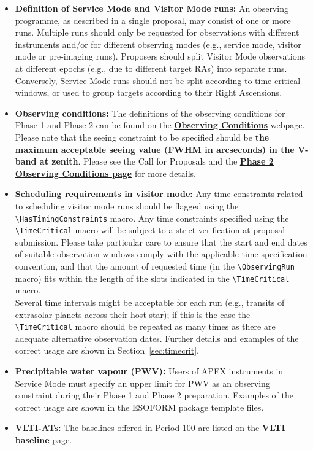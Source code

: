 \documentclass{article}
\begin{document}
\begin{itemize}
\item{\bf Definition of Service Mode and Visitor Mode runs: }
An observing programme, as described in a single proposal, may consist of one or more runs.
Multiple runs should only be requested for observations with different instruments and/or for different observing modes (e.g., service mode, visitor mode or pre-imaging runs).  Proposers should split Visitor Mode observations at different epochs (e.g., due to different target RAs) into separate runs. Conversely, Service Mode runs should not be split according to time-critical windows, or used to group targets according to their Right Ascensions.


\item{\bf Observing conditions:} The definitions of the observing conditions for Phase 1 and Phase 2
can be found on the  \href{http://www.eso.org/sci/observing/phase2/ObsConditions.html}{\bf \underline{Observing Conditions}} webpage.
Please note that the seeing constraint to be specified should be 
{\bf the maximum acceptable seeing value (FWHM in arcseconds) in the V-band at zenith}.
Please see the Call for Proposals and the 
\href{http://www.eso.org/sci/observing/phase2/ObsConditions.html}{\bf\underline{Phase 2 Observing Conditions page}}
for more details.


\item{\bf Scheduling requirements in visitor mode: }
Any time constraints related to scheduling visitor mode runs should be flagged
using the \verb|\HasTimingConstraints| macro.
Any time constraints specified using the \verb|\TimeCritical| macro 
will be subject to a strict verification  at proposal submission. Please take
particular care to ensure
that the start and end dates of suitable observation windows comply
with the applicable time specification convention, and that the
amount of requested time (in the \verb|\ObservingRun| macro) fits
within the length of the slots indicated in the
\verb|\TimeCritical| macro.  \\
Several time intervals might be acceptable for each run 
(e.g., transits of extrasolar planets
across their host star); if this is the case the \verb|\TimeCritical| macro should be 
repeated as many   times as there are adequate alternative observation dates.
Further details and examples of the
correct usage are shown in Section~\ref{sec:timecrit}. 

\item \textbf{Precipitable water vapour (PWV):} Users of
APEX instruments in Service Mode must specify an upper limit for PWV
  as an observing constraint during their Phase 1 and Phase 2
  preparation. Examples of the correct usage are shown in the ESOFORM package 
  template files.

 \item{\bf VLTI-ATs:} The baselines offered in Period 100 are listed on the
\href{http://www.eso.org/sci/facilities/paranal/telescopes/vlti/configuration/index.html}
{\bf\underline{VLTI baseline}} page.

\end{itemize}
\end{document}
